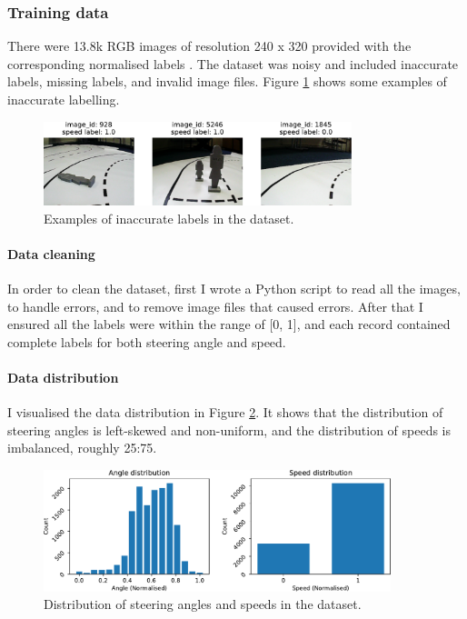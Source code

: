 \documentclass{article}
\begin{document}
\subsubsection{Training data}

There were 13.8k RGB images of resolution 240 x 320 provided with the corresponding normalised labels \citep{Kaggle}. The dataset was noisy and included inaccurate labels, missing labels, and invalid image files. Figure \ref{fig:inaccurate_label} shows some examples of inaccurate labelling.

\begin{figure}[h]
  \centering
  \includegraphics[width=0.8\textwidth]{figures/inaccurate_label.pdf}
  \caption{Examples of inaccurate labels in the dataset.}
  \label{fig:inaccurate_label}
\end{figure}

\paragraph{Data cleaning}
In order to clean the dataset, first I wrote a Python script to read all the images, to handle errors, and to remove image files that caused errors. After that I ensured all the labels were within the range of [0, 1], and each record contained complete labels for both steering angle and speed.

\paragraph{Data distribution}
I visualised the data distribution in Figure \ref{fig:angle_speed_distribution}. It shows that the distribution of steering angles is left-skewed and non-uniform, and the distribution of speeds is imbalanced, roughly 25:75.

\begin{figure}[h]
  \centering
  \includegraphics[width=0.9\textwidth]{figures/angle_speed_distribution.pdf}
  \caption{Distribution of steering angles and speeds in the dataset.}
  \label{fig:angle_speed_distribution}
\end{figure}
\end{document}
